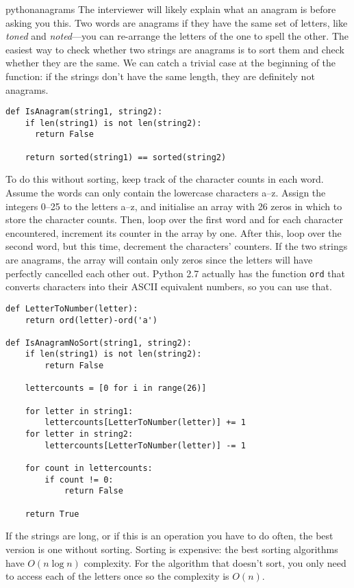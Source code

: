 \begin{answer}{pythonanagrams}
The interviewer will likely explain what an anagram is before asking you this.
Two words are anagrams if they have the same set of letters, like \emph{toned} and \emph{noted}---you can re-arrange the letters of the one to spell the other.
The easiest way to check whether two strings are anagrams is to sort them and check whether they are the same.
We can catch a trivial case at the beginning of the function: if the strings don't have the same length, they are definitely not anagrams.
\begin{verbatim}
def IsAnagram(string1, string2):
    if len(string1) is not len(string2):
      return False

    return sorted(string1) == sorted(string2)
\end{verbatim}
%
To do this without sorting, keep track of the character counts in each word.
Assume the words can only contain the lowercase characters a--z.
Assign
the integers 0--25
to
the letters a--z, and initialise an array with 26 zeros in which to store the character counts.
Then, loop over the first word and for each character encountered, increment its counter in the array by one.
After this, loop over the second word, but this time, decrement the characters' counters.
If the two strings are anagrams, the array will contain only zeros since the letters will have perfectly cancelled each other out.
Python 2.7 actually has the function \verb+ord+ that converts characters into their ASCII equivalent numbers, so you can use that.
\begin{verbatim}
def LetterToNumber(letter):
    return ord(letter)-ord('a')

def IsAnagramNoSort(string1, string2):
    if len(string1) is not len(string2):
        return False

    lettercounts = [0 for i in range(26)]

    for letter in string1:
        lettercounts[LetterToNumber(letter)] += 1
    for letter in string2:
        lettercounts[LetterToNumber(letter)] -= 1

    for count in lettercounts:
        if count != 0:
            return False

    return True
\end{verbatim}

If the strings are long, or if this is an operation you have to do often, the best version is one without sorting.
Sorting is expensive: the best sorting algorithms have $O(n\log{n})$ complexity.
For the algorithm that doesn't sort, you only need to access each of the letters once so the complexity is $O(n)$.
\end{answer}
